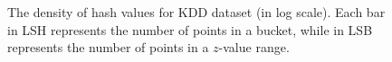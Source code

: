 \begin{figure}[!t]
\vspace{-0.1in}
	\centerline{
    \hspace{-0.1in}
    }
    \vspace{-0.1in}
	\caption{The density of hash values for KDD dataset (in log scale). Each bar in LSH represents the number of points in a bucket, while in LSB represents the number of points in a $z$-value range.}
	\label{fig:densitydist}
\vspace{-0.2in}
\end{figure}



